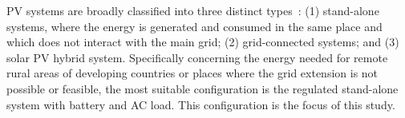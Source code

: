 \documentclass[journal]{IEEEtran}
\begin{document}
PV systems are broadly classified into three distinct types~\cite{Mohanty}: (1) stand-alone systems, where the energy is generated and consumed in the same place and which does not interact with the main grid; (2) grid-connected systems; and (3) solar PV hybrid system. %
%
Specifically concerning the energy needed for remote rural areas of developing countries or places where the grid extension is not possible or feasible, 
the most suitable configuration is the regulated stand-alone system with battery and AC load. This configuration is the focus of this study.
\end{document}
